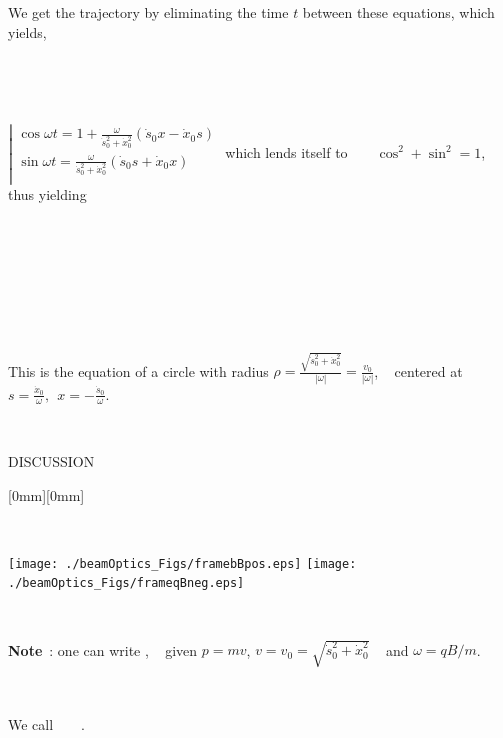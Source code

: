 \documentclass[12pt]{paper}
\newcommand{\nin}{\noindent}
\newcommand{\blue}{\color{blue}}
\begin{document}
~

~

We get the trajectory by eliminating the time $t$ between these equations, which yields, 

~

~

$\left| 
\begin{array}{l} 
 \cos\omega t  = 1 + \frac{\textstyle{\omega}}{\textstyle{\dot s_0^2+\dot x_0^2}}   (\dot s_0 x - \dot x_0 s)\\
 \sin\omega t  = \frac{\textstyle{\omega}}{\textstyle{\dot s_0^2+\dot x_0^2}}   (\dot s_0 s + \dot x_0 x) \\
\end{array} 
\right.$   which lends itself to  ~ ~ $\cos^2 + \sin^2 = 1$, thus yielding 


~

~

\hfill {}  \hfill ~




\clearpage





~

\nin This is the equation of a circle with radius 
$\rho = \frac{\textstyle{\sqrt{\dot s_0^2 + \dot x_0^2}}}{\textstyle{|\omega|}}= \frac{\textstyle{v_0}}{\textstyle{|\omega|}}$, ~ 
centered at 
$s = \frac{\textstyle{\dot x_0}}{\textstyle{\omega}}, ~ ~  x = -\frac{\textstyle{\dot s_0}}{\textstyle{\omega}}  $. 

~

\hfill DISCUSSION   \hfill ~ ~ 

   \hfill \raisebox{-10mm}[0mm][0mm]{}  \hfill ~


~

\hfill \texttt{[image: ./beamOptics\_Figs/framebBpos.eps]}  \hfill \texttt{[image: ./beamOptics\_Figs/frameqBneg.eps]} \hfill ~

~

{\bf Note}~:  one can write  {\blue {}}, ~ given $p=mv$, $v=v_0 = \sqrt{\dot s_0^2 + \dot x_0^2}$ ~ and 
$\omega = qB/m$. 

~

\hfill We call ~ ~  {\blue {}}.   \hfill ~ ~ 

~
\end{document}
